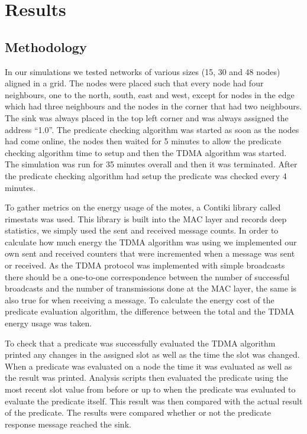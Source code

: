 \section{Results}

\subsection{Methodology}

In our simulations we tested networks of various sizes (15, 30 and 48 nodes) aligned in a grid. The nodes were placed such that every node had four neighbours, one to the north, south, east and west, except for nodes in the edge which had three neighbours and the nodes in the corner that had two neighbours. The sink was always placed in the top left corner and was always assigned the address ``1.0''. The predicate checking algorithm was started as soon as the nodes had come online, the nodes then waited for 5 minutes to allow the predicate checking algorithm time to setup and then the TDMA algorithm was started. The simulation was run for 35 minutes overall and then it was terminated. After the predicate checking algorithm had setup the predicate was checked every 4 minutes.

To gather metrics on the energy usage of the motes, a Contiki library called rimestats was used. This library is built into the MAC layer and records deep statistics, we simply used the sent and received message counts. In order to calculate how much energy the TDMA algorithm was using we implemented our own sent and received counters that were incremented when a message was sent or received. As the TDMA protocol was implemented with simple broadcasts there should be a one-to-one correspondence between the number of successful broadcasts and the number of transmissions done at the MAC layer, the same is also true for when receiving a message. To calculate the energy cost of the predicate evaluation algorithm, the difference between the total and the TDMA energy usage was taken.

To check that a predicate was successfully evaluated the TDMA algorithm printed any changes in the assigned slot as well as the time the slot was changed. When a predicate was evaluated on a node the time it was evaluated as well as the result was printed. Analysis scripts then evaluated the predicate using the most recent slot value from before or up to when the predicate was evaluated to evaluate the predicate itself. This result was then compared with the actual result of the predicate. The results were compared whether or not the predicate response message reached the sink.

